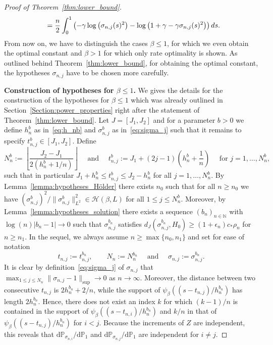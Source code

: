 \documentclass[10.5pt,letter]{article}
\numberwithin{equation}{section}
\theoremstyle{definition}
\newcommand{\N}{\mathbb{N}}
\renewcommand{\P}{\mathbb{P}}
\newcommand{\1}{\mathbbm{1}}
\begin{document}
\begin{proof}[Proof of Theorem~\ref{thm:lower_bound}]
\begin{align}
\begin{split}
    &\hspace{0.5cm} = \frac{n}{2} \int_0^1 \left( -\gamma\log\left(\sigma_{n,j}(s)^2\right) - \log\left( 1+\gamma-\gamma\sigma_{n,j}(s)^2\right) \right) ds.
\end{split}
\end{align}
From now on, we have to distinguish the cases $\beta\leq 1$, for which we even obtain the optimal constant and $\beta>1$ for which only rate optimality is shown. As outlined behind Theorem~\ref{thm:lower_bound}, for obtaining the optimal constant, the hypotheses $\sigma_{n,j}$ have to be chosen more carefully. \smallskip


\textbf{Construction of hypotheses for $\beta\leq 1$.} We gives the details for the construction of the hypotheses for $\beta \leq 1$ which was already outlined in Section~\ref{Section:power_properties} right after the statement of Theorem~\ref{thm:lower_bound}. Let $J=[J_1,J_2]$ and for a parameter $b>0$ we define $h_n^b$ as in~\eqref{eq:h_nb} and $\sigma_{n,j}^b$ as in~\eqref{eq:sigma_j} such that it remains to specify $t_{n,j}^b\in [J_1,J_2]$. Define \vspace{-0.1cm}
\[ N_n^b:=\left\lfloor  \frac{J_2-J_1}{2(h_n^b+1/n)}\right\rfloor\quad\textrm{ and }\quad  t_{n,j}^b := J_1+ (2j-1)\left( h_n^b + \frac1n\right) \quad \textrm{ for } j=1,\dots, N_n^b,\]
such that in particular $J_1+h_n^b\leq t_{n,j}^b\leq J_2-h_n^b$ for all $j=1,\dots, N_n^b$. By Lemma~\ref{lemma:hypotheses_Hölder} there exists $n_0$ such that for all $n\geq n_0$ we have $(\sigma_{n,j}^b)^2/\|\sigma_{n,j}^b\|_{L^2}^2\in\mathcal{H}(\beta,L)$ for all $1\leq j\leq N_n^b$. Moreover, by Lemma~\ref{lemma:hypotheses_solution} there exists a sequence $(b_n)_{n\in\N}$ with $\log(n)|b_n-1|\rightarrow 0$ such that $\sigma_{n,j}^{b_n}$ satisfies $d_J(\sigma_{n,j}^{b_n},H_0)\geq (1+\epsilon_n)c_*\rho_n$ for $n\geq n_1$. In the sequel, we always assume $n\geq \max\{n_0,n_1\}$ and set for ease of notation
\[ t_{n,j}:=t_{n,j}^{b_n}, \qquad N_n:=N_n^{b_n}\quad \textrm{ and } \quad \sigma_{n,j}:=\sigma_{n,j}^{b_n}.\] 
It is clear by definition~\eqref{eq:sigma_j} of $\sigma_{n,j}$ that $\max_{1\leq j\leq N_n} \|\sigma_{n,j}-1\|_{\sup}\rightarrow 0$ as $n\to\infty$. Moreover, the distance between two consecutive $t_{n,j}$ is $2h_n^{b_n}+2/n$, while the support of $\psi_\beta((s-t_{n,j})/h_n^{b_n})$ has length $2h_n^{b_n}$. Hence, there does not exist an index $k$ for which $(k-1)/n$ is contained in the support of $\psi_\beta((s-t_{n,i})/h_n^{b_n})$ and $k/n$ in that of $\psi_\beta((s-t_{n,j})/h_n^{b_n})$ for $i<j$. Because the increments of $Z$ are independent, this reveals that $\textrm{d}\P_{\sigma_{n,i}}/\textrm{d}\P_1$ and  $\textrm{d}\P_{\sigma_{n,j}}/\textrm{d}\P_1$ are independent for $i\neq j$.\smallskip




\end{proof}
\end{document}
